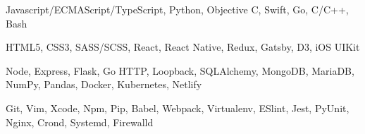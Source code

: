 

\begin{cvskills}


    {Javascript/ECMAScript/TypeScript, Python, Objective C, Swift, Go, C/C++, Bash}

    {HTML5, CSS3, SASS/SCSS, React, React Native, Redux, Gatsby, D3, iOS UIKit}

    {Node, Express, Flask, Go HTTP, Loopback, SQLAlchemy, MongoDB, MariaDB, NumPy, Pandas, Docker, Kubernetes, Netlify}

    {Git, Vim, Xcode, Npm, Pip, Babel, Webpack, Virtualenv, ESlint, Jest, PyUnit, Nginx, Crond, Systemd, Firewalld}



\end{cvskills}
